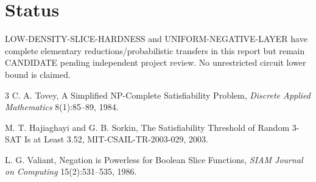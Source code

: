 \documentclass[11pt]{article}
\begin{document}
\section{Status}

LOW-DENSITY-SLICE-HARDNESS and UNIFORM-NEGATIVE-LAYER have complete elementary reductions/probabilistic transfers in this report but remain CANDIDATE pending independent project review. No unrestricted circuit lower bound is claimed.

\begin{thebibliography}{3}
C. A. Tovey, A Simplified NP-Complete Satisfiability Problem,
\emph{Discrete Applied Mathematics} 8(1):85--89, 1984.

M. T. Hajiaghayi and G. B. Sorkin,
The Satisfiability Threshold of Random 3-SAT Is at Least 3.52,
MIT-CSAIL-TR-2003-029, 2003.

L. G. Valiant, Negation is Powerless for Boolean Slice Functions,
\emph{SIAM Journal on Computing} 15(2):531--535, 1986.
\end{thebibliography}
\end{document}
